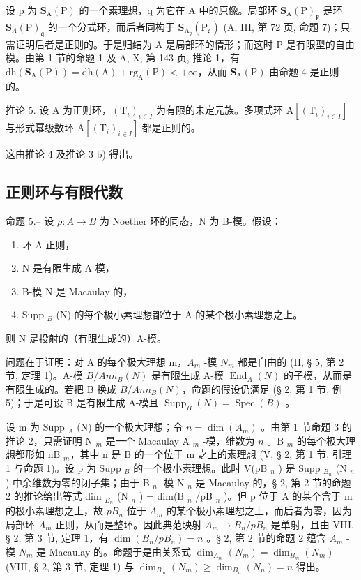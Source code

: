 设 p 为 \(\mathbf{S}_{\mathrm{A}}(\mathrm{P})\) 的一个素理想，q 为它在 A 中的原像。局部环 \(\mathbf{S}_{\mathrm{A}}(\mathrm{P})_{\mathfrak{p}}\) 是环 \(\mathbf{S}_{\Lambda}(\mathrm{P})_{\mathfrak{q}}\) 的一个分式环，而后者同构于 \(\mathbf{S}_{\mathrm{A}_{q}}(\mathrm{P}_{\mathfrak{q}})\) (A, III, 第 72 页, 命题 7)；只需证明后者是正则的。于是归结为 A 是局部环的情形；而这时 P 是有限型的自由模。由第 1 节的命题 1 及 A, X, 第 143 页, 推论 1，有 \(\mathrm{dh}(\mathbf{S}_{\mathrm{A}}(\mathrm{P})) = \mathrm{dh}(\mathrm{A}) + \mathrm{rg}_{\mathrm{A}}(\mathrm{P}) < +\infty\)，从而 \(\mathbf{S}_{\mathrm{A}}(\mathrm{P})\) 由命题 4 是正则的。

推论 5. 设 A 为正则环，\((\mathrm{T}_i)_{i\in I}\) 为有限的未定元族。多项式环 \(\mathrm{A}[(\mathrm{T}_i)_{i\in I}]\) 与形式幂级数环 \(\mathrm{A}[(\mathrm{T}_i)_{i\in I}]\) 都是正则的。

这由推论 4 及推论 3 b) 得出。

\subsection{正则环与有限代数}

命题 5.-- 设 \(\rho: A \to B\) 为 Noether 环的同态，N 为 B-模。假设：

\begin{enumerate}
\def\labelenumi{\alph{enumi})}
\item
  环 A 正则，
\item
  N 是有限生成 A-模，
\item
  B-模 N 是 Macaulay 的，
\item
  Supp \(_{B}\) (N) 的每个极小素理想都位于 A 的某个极小素理想之上。
\end{enumerate}

则 N 是投射的（有限生成的）A-模。

问题在于证明：对 A 的每个极大理想 m，\(A_{m}\) -模 \(N_{m}\) 都是自由的 (II, § 5, 第 2 节, 定理 1)。A-模 \(B/Ann_{B}(N)\) 是有限生成 A-模 \(\operatorname{End}_{A}(N)\) 的子模，从而是有限生成的。若把 B 换成 \(B/Ann_{B}(N)\)，命题的假设仍满足 (§ 2, 第 1 节, 例 5)；于是可设 B 是有限生成 A-模且 \(\operatorname{Supp}_{B}(N) = \operatorname{Spec}(B)\) 。

设 m 为 Supp \(_A\) (N) 的一个极大理想；令 \(n = \dim(A_m)\) 。由第 1 节命题 3 的推论 2，只需证明 N \(_m\) 是一个 Macaulay A \(_m\) -模，维数为 \(n\) 。B \(_m\) 的每个极大理想都形如 nB \(_m\)，其中 n 是 B 的一个位于 m 之上的素理想 (V, § 2, 第 1 节, 引理 1 与命题 1)。设 p 为 Supp \(_B\) 的一个极小素理想。此时 V(pB \(_n\) ) 是 Supp \(_{B_n}\) (N \(_n\) ) 中余维数为零的闭子集；由于 B \(_n\) -模 N \(_n\) 是 Macaulay 的，§ 2, 第 2 节的命题 2 的推论给出等式 dim \(_{B_n}\) (N \(_n\) ) = dim(B \(_n\) /pB \(_n\) )。但 p 位于 A 的某个含于 m 的极小素理想之上，故 \(pB_{n}\) 位于 \(A_{m}\) 的某个极小素理想之上，而后者为零，因为局部环 \(A_{m}\) 正则，从而是整环。因此典范映射 \(A_{m} \to B_{n}/pB_{n}\) 是单射，且由 VIII, § 2, 第 3 节, 定理 1，有 \(\dim(B_{n}/pB_{n}) = n\) 。§ 2, 第 2 节的命题 2 蕴含 \(A_{m}\) -模 \(N_{m}\) 是 Macaulay 的。命题于是由关系式 \(\dim_{A_{m}}(N_{m}) = \dim_{B_{m}}(N_{m})\) (VIII, § 2, 第 3 节, 定理 1) 与 \(\dim_{B_{m}}(N_{m}) \geqslant \dim_{B_{n}}(N_{n}) = n\) 得出。

